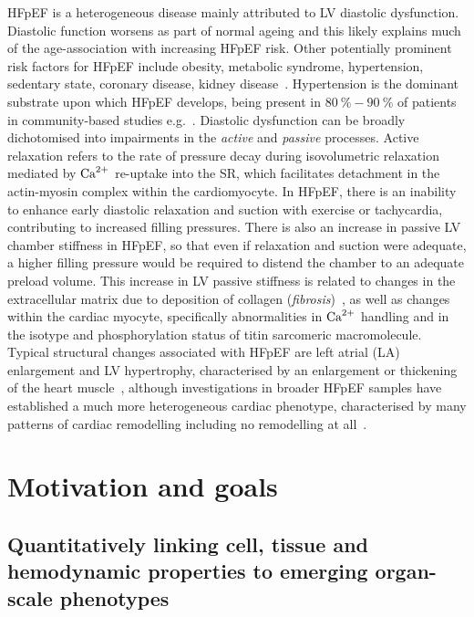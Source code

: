 \vspace{0.2cm}
HFpEF is a heterogeneous disease mainly attributed to LV diastolic dysfunction. Diastolic function worsens as part of normal ageing \cite{Andersen:2014} and this likely explains much of the age-association with increasing HFpEF risk. Other potentially prominent risk factors for HFpEF include obesity, metabolic syndrome, hypertension, sedentary state, coronary disease, kidney disease~\cite{Pfeffer:2019}. Hypertension is the dominant substrate upon which HFpEF develops, being present in $\SI{80}{\percent}-\SI{90}{\percent}$ of patients in community-based studies e.g.~\cite{Borlaug:2009}. Diastolic dysfunction can be broadly dichotomised into impairments in the \textit{active} and \textit{passive} processes. Active relaxation refers to the rate of pressure decay during isovolumetric relaxation mediated by $\textrm{Ca}^{2+}$ re-uptake into the SR, which facilitates detachment in the actin-myosin complex within the cardiomyocyte. In HFpEF, there is an inability to enhance early diastolic relaxation and suction with exercise or tachycardia, contributing to increased filling pressures. There is also an increase in passive LV chamber stiffness in HFpEF, so that even if relaxation and suction were adequate, a higher filling pressure would be required to distend the chamber to an adequate preload volume. This increase in LV passive stiffness is related to changes in the extracellular matrix due to deposition of collagen (\textit{fibrosis})~\cite{Burlew:2002}, as well as changes within the cardiac myocyte, specifically abnormalities in $\textrm{Ca}^{2+}$ handling and in the isotype and phosphorylation status of titin sarcomeric macromolecule. Typical structural changes associated with HFpEF are left atrial (LA) enlargement and LV hypertrophy, characterised by an enlargement or thickening of the heart muscle~\cite{Zile:2004}, although investigations in broader HFpEF samples have established a much more heterogeneous cardiac phenotype, characterised by many patterns of cardiac remodelling including no remodelling at all~\cite{Shah:2012}.


%
%
%
\section{Motivation and goals}


%
%
%
\subsection{Quantitatively linking cell, tissue and hemodynamic properties to emerging organ-scale phenotypes}

